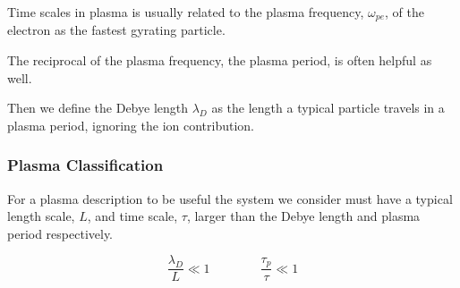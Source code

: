         Time scales in plasma is usually related to the plasma frequency, \(\omega_{pe}\), of the
        electron as the fastest gyrating particle.

        The reciprocal of the plasma frequency, the plasma period,  is often
        helpful as well.

        Then we define the Debye length \(\lambda_D\) as the length a typical particle
        travels in a plasma period, ignoring the ion contribution.



		\subsubsection{Plasma Classification}
        For a plasma description to be useful the system we consider must have
        a typical length scale, \(L\), and time scale, \(\tau\), larger than the Debye length and plasma
        period respectively.

        \[\frac{\lambda_D}{L} \ll 1  \qquad{} \qquad \frac{\tau_p}{\tau} \ll 1 \]


















